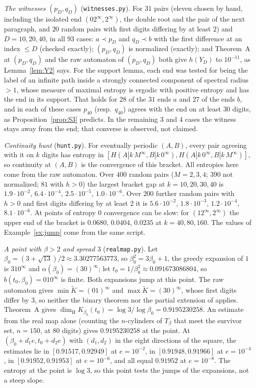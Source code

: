 \documentclass[11pt]{amsart}
\theoremstyle{definition}
\theoremstyle{remark}
\newcommand{\dimH}{\dim_{\mathrm H}}
\newcommand{\K}{\tilde K}
\begin{document}
\emph{The witnesses $(p_D,q_D)$} (\texttt{witnesses.py}). For $31$ pairs (eleven chosen by hand, including the isolated end $(02^\infty,2^\infty)$, the double root and the pair of the next paragraph, and $20$ random pairs with first digits differing by at least $2$) and $D=10,20,40$, in all $93$ cases: $a\prec p_D$ and $q_D\prec b$ with the first difference at an index $\le D$ (checked exactly); $(p_D,q_D)$ is normalized (exactly); and Theorem~A at $(p_D,q_D)$ and the raw automaton of $(p_D,q_D)$ both give $h(Y_D)$ to $10^{-11}$, as Lemma~\ref{lem:Y2} says. For the support lemma, each end was tested for being the label of an infinite path inside a strongly connected component of spectral radius $>1$, whose measure of maximal entropy is ergodic with positive entropy and has the end in its support. That holds for $28$ of the $31$ ends $a$ and $27$ of the ends $b$, and in each of these cases $p_{40}$ (resp.\ $q_{40}$) agrees with the end on at least $30$ digits, as Proposition~\ref{prop:S3} predicts. In the remaining $3$ and $4$ cases the witness stays away from the end; that converse is observed, not claimed.

\emph{Continuity hunt} (\texttt{hunt.py}). For eventually periodic $(A,B)$, every pair agreeing with it on $k$ digits has entropy in $[H(A|k\,M^\infty,B|k\,0^\infty),H(A|k\,0^\infty,B|k\,M^\infty)]$, so continuity at $(A,B)$ is the convergence of this bracket. All entropies here come from the raw automaton. Over $400$ random pairs ($M=2,3,4$; $390$ not normalized; $81$ with $h>0$) the largest bracket gap at $k=10,20,30,40$ is $1.9\cdot10^{-2}$, $6.4\cdot10^{-4}$, $2.5\cdot10^{-5}$, $1.0\cdot10^{-6}$. Over $200$ further random pairs with $h>0$ and first digits differing by at least $2$ it is $5.6\cdot10^{-2}$, $1.8\cdot10^{-3}$, $1.2\cdot10^{-4}$, $8.1\cdot10^{-6}$. At points of entropy $0$ convergence can be slow: for $(12^\infty,2^\infty)$ the upper end of the bracket is $0.0680$, $0.0404$, $0.0235$ at $k=40,80,160$. The values of Example~\ref{ex:jump} come from the same script.

\emph{A point with $\beta>2$ and spread $3$} (\texttt{realmap.py}). Let $\beta_0=(3+\sqrt{13})/2\approx3.30277563773$, so $\beta_0^2=3\beta_0+1$, the greedy expansion of $1$ is $310^\infty$ and $\alpha(\beta_0)=(30)^\infty$; let $t_0=1/\beta_0^2\approx0.091673086804$, so $b(t_0,\beta_0)=010^\infty$ is finite. Both expansions jump at this point. The raw automaton gives $\min\K=(01)^\infty$ and $\max\K=(30)^\infty$, whose first digits differ by $3$, so neither the binary theorem nor the partial extension of \cite{Nem26} applies. Theorem~A gives $\dimH K_{\beta_0}(t_0)=\log3/\log\beta_0=0.9195230258$. An estimate from the real map alone (counting the $n$-cylinders of $T_\beta$ that meet the survivor set, $n=150$, at $80$ digits) gives $0.9195230258$ at the point. At $(\beta_0+d_1e,t_0+d_2e)$ with $(d_1,d_2)$ in the eight directions of the square, the estimates lie in $[0.91517,0.92949]$ at $e=10^{-2}$, in $[0.91948,0.91966]$ at $e=10^{-4}$, in $[0.91952,0.91953]$ at $e=10^{-6}$, and all equal $0.91952$ at $e=10^{-8}$. The entropy at the point is $\log3$, so this point tests the jumps of the expansions, not a steep slope.
\end{document}
